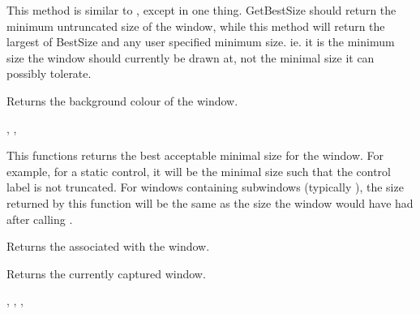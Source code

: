 \label{wxwindowgetadjustedbestsize}


This method is similar to , except
in one thing.  GetBestSize should return the minimum untruncated size of the
window, while this method will return the largest of BestSize and any user
specified minimum size.  ie. it is the minimum size the window should currently
be drawn at, not the minimal size it can possibly tolerate.

\label{wxwindowgetbackgroundcolour}


Returns the background colour of the window.


,\rtfsp
{},\rtfsp
{}

\label{wxwindowgetbestsize}


This functions returns the best acceptable minimal size for the window. For
example, for a static control, it will be the minimal size such that the
control label is not truncated. For windows containing subwindows (typically
), the size returned by this function will be the
same as the size the window would have had after calling
.

\label{wxwindowgetcaret}


Returns the  associated with the window.

\label{wxwindowgetcapture}


Returns the currently captured window.


, 
, 
, 

